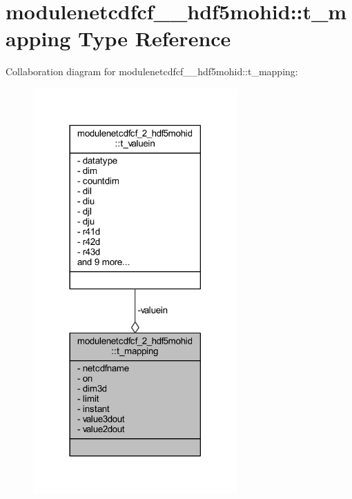 \hypertarget{structmodulenetcdfcf__2__hdf5mohid_1_1t__mapping}{}\section{modulenetcdfcf\+\_\+\_\+hdf5mohid\+:\+:t\+\_\+mapping Type Reference}
\label{structmodulenetcdfcf__2__hdf5mohid_1_1t__mapping}


Collaboration diagram for modulenetcdfcf\+\_\+\_\+hdf5mohid\+:\+:t\+\_\+mapping\+:\nopagebreak
\begin{figure}[H]
\begin{center}
\leavevmode
\includegraphics[width=222pt]{structmodulenetcdfcf__2__hdf5mohid_1_1t__mapping__coll__graph}
\end{center}
\end{figure}
